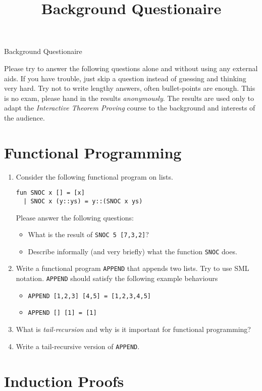 \documentclass[a4paper,10pt,oneside]{scrartcl}
\title{Background Questionaire}
\begin{document}
\begin{center}
 Background Questionaire
\end{center}
\bigskip


Please try to answer the following questions alone and without using
any external aids. If you have trouble, just skip a question instead
of guessing and thinking very hard. Try not to write lengthy answers,
often bullet-points are enough. This is no exam, please hand in the
results \emph{anonymously}.  The results are used only to adapt the
\emph{Interactive Theorem Proving} course to the background and
interests of the audience.


\section{Functional Programming}

\begin{enumerate}
\item Consider the following functional program on lists.
\begin{verbatim}
fun SNOC x [] = [x]
  | SNOC x (y::ys) = y::(SNOC x ys) 
\end{verbatim}
Please answer the following questions:
\begin{itemize}
\item What is the result of \texttt{SNOC 5 [7,3,2]}? 
\item Describe informally (and very briefly) what the function \texttt{SNOC} does.
\end{itemize}

\item Write a functional program \texttt{APPEND} that appends two lists. 
Try to use SML notation. 
\texttt{APPEND} should satisfy the following example behaviours
\begin{itemize}
\item \texttt{APPEND [1,2,3] [4,5] = [1,2,3,4,5]}
\item \texttt{APPEND [] [1] = [1]}
\end{itemize}


\item What is \emph{tail-recursion} and why is it important for functional programming?

\item Write a tail-recursive version of \texttt{APPEND}.
 
\end{enumerate}


\section{Induction Proofs}
\end{document}

